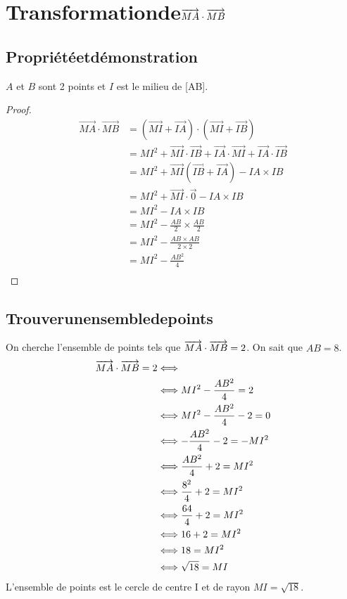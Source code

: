 \documentclass[a4paper,twoside,10pt,french,twocolumn]{scrartcl}
\begin{document}
\section{Transformation\:de\:$\protect\overrightarrow{MA} \cdot \protect\overrightarrow{MB}$}
\subsection{Propriété\:et\:démonstration}
$A$ et $B$ sont 2 points et $I$ est le milieu de [AB].
\begin{proof}
\begin{align*}
	\overrightarrow{MA} \cdot \overrightarrow{MB} &=(\overrightarrow{MI} + \overrightarrow{IA}) \cdot (\overrightarrow{MI} + \overrightarrow{IB})\\
	 &= MI^2 + \overrightarrow{MI} \cdot \overrightarrow{IB} + \overrightarrow{IA} \cdot \overrightarrow{MI} + \overrightarrow{IA} \cdot \overrightarrow{IB}\\
	 &= MI^2 + \overrightarrow{MI} (\overrightarrow{IB} + \overrightarrow{IA}) - IA \times IB\\
	 &= MI^2 + \overrightarrow{MI} \cdot \overrightarrow{0} - IA \times IB\\
	 &= MI^2 - IA \times IB\\
	 &= MI^2 - \frac{AB}{2} \times \frac{AB}{2}\\
	 &= MI^2 - \frac{AB \times AB}{2 \times 2}\\
	 &= MI^2 - \frac{AB^2}{4}\\
\end{align*}
\end{proof}
\subsection{Trouver\:un\:ensemble\:de\:points}
On cherche l'ensemble de points tels que $\protect\overrightarrow{MA} \cdot \protect\overrightarrow{MB} = 2$. On sait que $AB = 8$.
\begin{align*}
	\protect\overrightarrow{MA} \cdot \protect\overrightarrow{MB} = 2 &\Longleftrightarrow\\
	 &\Longleftrightarrow MI^2 - \frac{AB^2}{4} = 2\\
	 &\Longleftrightarrow MI^2 - \frac{AB^2}{4} -2 = 0\\
	 &\Longleftrightarrow - \frac{AB^2}{4} -2 = - MI^2\\
	&\Longleftrightarrow \frac{AB^2}{4} +2 = MI^2\\
	&\Longleftrightarrow \frac{8^2}{4} +2 = MI^2\\
	&\Longleftrightarrow \frac{64}{4} +2 = MI^2\\
	&\Longleftrightarrow 16 +2 = MI^2\\
	&\Longleftrightarrow 18 = MI^2\\
	&\Longleftrightarrow \sqrt{18} = MI\\
\end{align*}
L'ensemble de points est le cercle de centre I et de rayon $MI = \sqrt{18}$.
\end{document}
